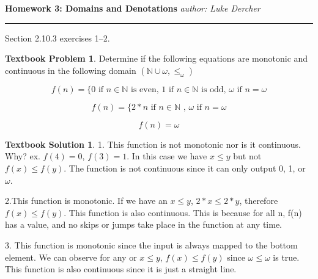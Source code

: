 \documentclass[10pt]{article}
\theoremstyle{definition}
\newtheorem{bp}{Textbook Problem}
\newtheorem{ts}{Textbook Solution}
\begin{document}
  

  

  

  \noindent

  

  \textbf{Homework 3: Domains and Denotations} \hfill \emph{author: Luke Dercher}

  

  \hrule

  

  

  

  \vspace{.3in}

  

  

  

  Section 2.10.3 exercises 1--2.

  

  

  

  \begin{bp}

  Determine if the following equations are monotonic and continuous in the following domain $(\mathds{N} \cup {\omega}, \leq_\omega)$

  \begin{equation}
  f(n) = \{ 0 \textrm{ if } n \in \mathds{N} \textrm{ is even, } 1 \textrm{ if } n \in \mathds{N} \textrm{ is odd, } \omega \textrm{ if } n = \omega
  \end{equation}

  

  \begin{equation}
  f(n) = \{ 2*n \textrm{ if } n \in \mathds{N} \textrm{ , } \omega \textrm{ if } n = \omega 
  \end{equation}

\begin{equation}
    f(n) = \omega
\end{equation}
  

  \end{bp}

  

  \begin{ts}

  

  1. This function is not monotonic nor is it continuous. Why? ex. $f(4) = 0$, $f(3) = 1$. In this case we have $x \leq y$ but not $f(x) \leq f(y)$. The function is not continuous since it can only output 0, 1, or $\omega$.

  

  2.This function is monotonic. If we have an $x \leq y$, $2*x \leq 2*y$, therefore $f(x) \leq f(y)$. This function is also continuous. This is because for all n, f(n) has a value, and no skips or jumps take place in the function at any time.  

  3. This function is monotonic since the input is always mapped to the bottom element. We can observe for any or $x \leq y$, $f(x) \leq f(y)$ since $\omega \leq \omega$ is true. This function is also continuous since it is just a straight line. 
  \end{ts}
\end{document}
